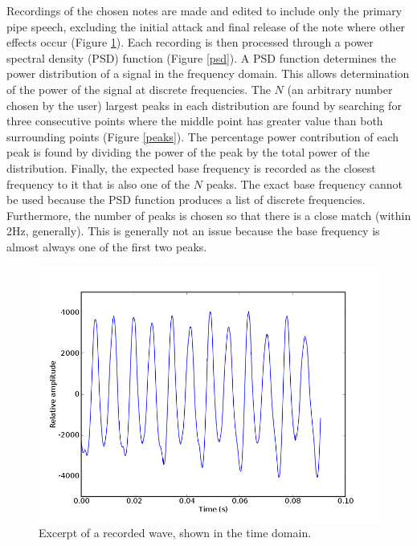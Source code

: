 \documentclass[twocolumn]{article}
\begin{document}
Recordings of the chosen notes are made and edited to include only the primary pipe speech, excluding the initial attack and final release of the note where other effects occur (Figure \ref{time}). Each recording is then processed through a power spectral density (PSD) function (Figure \ref{psd}). A PSD function determines the power distribution of a signal in the frequency domain. This allows determination of the power of the signal at discrete frequencies. The $N$ (an arbitrary number chosen by the user) largest peaks in each distribution are found by searching for three consecutive points where the middle point has greater value than both surrounding points (Figure \ref{peaks}). The percentage power contribution of each peak is found by dividing the power of the peak by the total power of the distribution. Finally, the expected base frequency is recorded as the closest frequency to it that is also one of the $N$ peaks. The exact base frequency cannot be used because the PSD function produces a list of discrete frequencies. Furthermore, the number of peaks is chosen so that there is a close match (within 2Hz, generally). This is generally not an issue because the base frequency is almost always one of the first two peaks.

\begin{figure}
\centering
\includegraphics[width=\linewidth]{figures/recording-time.png}
\caption{Excerpt of a recorded wave, shown in the time domain.}
\label{time}
\end{figure}
\end{document}
